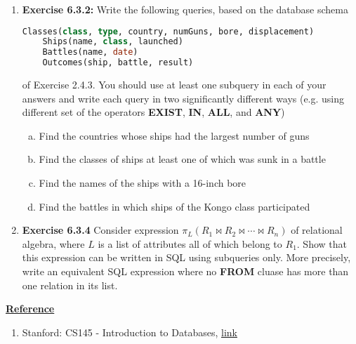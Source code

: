 \documentclass[12pt]{article}
\begin{document}
\begin{enumerate}[1.]
    \item \textbf{Exercise 6.3.2:} Write the following queries, based on the database
    schema

    \begin{lstlisting}[language=SQL]
    Classes(class, type, country, numGuns, bore, displacement)
    Ships(name, class, launched)
    Battles(name, date)
    Outcomes(ship, battle, result)
    \end{lstlisting}

    \bigskip

    of Exercise 2.4.3. You should use at least one subquery in each of your answers
    and write each query in two significantly different ways (e.g. using different
    set of the operators \textbf{EXIST}, \textbf{IN}, \textbf{ALL}, and \textbf{ANY})

    \bigskip

    \begin{enumerate}[a)]
        \item Find the countries whose ships had the largest number of guns
        \item Find the classes of ships at least one of which was sunk in a battle
        \item Find the names of the ships with a 16-inch bore
        \item Find the battles in which ships of the Kongo class participated
    \end{enumerate}

    \item \textbf{Exercise 6.3.4} Consider expression $\pi_L (R_1 \bowtie R_2 \bowtie
    \cdots \bowtie R_n)$ of relational algebra, where $L$ is a list of attributes all
    of which belong to $R_1$. Show that this expression can be written in SQL using
    subqueries only. More precisely, write an equivalent SQL expression where no
    \textbf{FROM} cluase has more than one relation in its list.

\end{enumerate}

\bigskip

\underline{\textbf{Reference}}

\bigskip

\begin{enumerate}[1)]
    \item Stanford: CS145 - Introduction to Databases, \href{http://infolab.stanford.edu/~ullman/fcdb/aut07/index.html}{link}
\end{enumerate}
\end{document}
